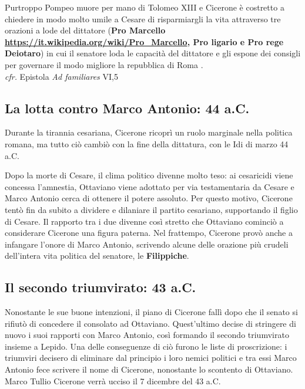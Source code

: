 \documentclass[10pt,a4paper]{article}
\begin{document}
Purtroppo Pompeo muore per mano di Tolomeo XIII e Cicerone è costretto a chiedere in modo molto umile a Cesare di risparmiargli la vita attraverso tre orazioni a lode del dittatore (\textbf{Pro Marcello \url{https://it.wikipedia.org/wiki/Pro_Marcello}, Pro ligario e Pro rege Deiotaro}) in cui il senatore loda le capacità del dittatore e gli espone dei consigli per governare il modo migliore la repubblica di Roma . \\

\textit{cfr.} Epistola \textit{Ad familiares} VI,5

\subsection*{La lotta contro Marco Antonio: 44 a.C.}

Durante la tirannia cesariana, Cicerone ricoprì un ruolo marginale nella politica romana, ma tutto ciò cambiò con la fine della dittatura, con le Idi di marzo 44 a.C.

Dopo la morte di Cesare, il clima politico divenne molto teso: ai cesaricidi viene concessa l'amnestia, Ottaviano viene adottato per via testamentaria da Cesare e Marco Antonio cerca di ottenere il potere assoluto. Per questo motivo, Cicerone tentò fin da subito a dividere e dilaniare il partito cesariano, supportando il figlio di Cesare. Il rapporto tra i due divenne così stretto che Ottaviano cominciò a considerare Cicerone una figura paterna. Nel frattempo, Cicerone provò anche a infangare l'onore di Marco Antonio, scrivendo alcune delle orazione più crudeli dell'intera vita politica del senatore, le \textbf{Filippiche}.

\subsection*{Il secondo triumvirato: 43 a.C.}

Nonostante le sue buone intenzioni, il piano di Cicerone fallì dopo che il senato si rifiutò di concedere il consolato ad Ottaviano. Quest'ultimo decise di stringere di nuovo i suoi rapporti con Marco Antonio, così formando il secondo triumvirato insieme a Lepido. Una delle conseguenze di ciò furono le liste di proscrizione: i triumviri decisero di eliminare dal principio i loro nemici politici e tra essi Marco Antonio fece scrivere il nome di Cicerone, nonostante lo scontento di Ottaviano. Marco Tullio Cicerone verrà ucciso il 7 dicembre del 43 a.C.\\
\end{document}
